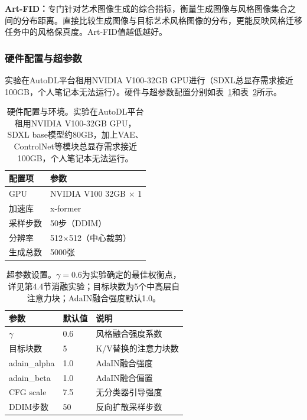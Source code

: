 \documentclass[twocolumn,a4paper,11pt]{ctexart}
\begin{document}
{\bfseries Art-FID：}专门针对艺术图像生成的综合指标，衡量生成图像与风格图像集合之间的分布距离。直接比较生成图像与目标艺术风格图像的分布，更能反映风格迁移任务中的风格保真度。Art-FID值越低越好。

\subsubsection{硬件配置与超参数}

实验在AutoDL平台租用NVIDIA V100-32GB GPU进行（SDXL总显存需求接近100GB，个人笔记本无法运行）。硬件与超参数配置分别如表~\ref{tab:hardware}和表~\ref{tab:hyperparams}所示。

\begin{table}[ht]
  \centering
  \caption{硬件配置与环境。实验在AutoDL平台租用NVIDIA V100-32GB GPU，SDXL base模型约80GB，加上VAE、ControlNet等模块总显存需求接近100GB，个人笔记本无法运行。}
  \label{tab:hardware}
  \small
  \begin{tabular}{ll}
    \toprule
    配置项 & 参数 \\
    \midrule
    GPU & NVIDIA V100 32GB $\times$ 1 \\
    加速库 & x-former \\
    采样步数 & 50步（DDIM） \\
    分辨率 & 512$\times$512（中心裁剪） \\
    生成总数 & 5000张 \\
    \bottomrule
  \end{tabular}
\end{table}

\begin{table}[ht]
  \centering
  \caption{超参数设置。$\gamma=0.6$为实验确定的最佳权衡点，详见第4.4节消融实验；目标块数为5个中高层自注意力块；AdaIN融合强度默认1.0。}
  \label{tab:hyperparams}
  \small
  \begin{tabular}{lll}
    \toprule
    参数 & 默认值 & 说明 \\
    \midrule
    $\gamma$ & 0.6 & 风格融合强度系数 \\
    目标块数 & 5 & K/V替换的注意力块数 \\
    adain\_alpha & 1.0 & AdaIN融合强度 \\
    adain\_beta  & 1.0 & AdaIN融合偏置 \\
    CFG scale & 7.5 & 无分类器引导强度 \\
    DDIM步数 & 50 & 反向扩散采样步数 \\
    \bottomrule
  \end{tabular}
\end{table}
\end{document}
